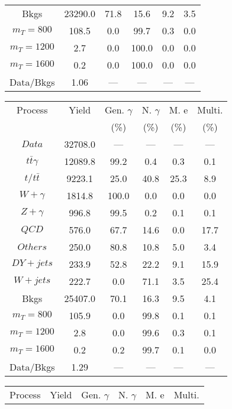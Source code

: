 \begin{figure}
\begin{minipage}[c]{0.32\textwidth}
{\begin{tabular}{cccccc}
Bkgs &  23290.0 &  71.8 &  15.6 &  9.2 &  3.5\\
$ m_{T} = 800 $ &  108.5 &  0.0 &  99.7 &  0.3 &  0.0\\
$ m_{T} = 1200 $ &  2.7 &  0.0 &  100.0 &  0.0 &  0.0\\
$ m_{T} = 1600 $ &  0.2 &  0.0 &  100.0 &  0.0 &  0.0\\
Data/Bkgs &  1.06 &  --- &  --- &  --- &  ---\\
\hline
\end{tabular}
}
\end{minipage}
\begin{minipage}[c]{0.32\textwidth}
\centering
\tiny{
\begin{tabular}{cccccc}
\hline
Process & Yield & Gen. $\gamma$ & N. $\gamma$ & M. e & Multi. \\
 &  & (\%) & (\%) & (\%) & (\%)  \\
\hline
                                                                      $ Data $ &  32708.0 &  --- &  --- &  --- &  ---\\
$ t\bar{t}\gamma $ &  12089.8 &  99.2 &  0.4 &  0.3 &  0.1\\
$ t/t\bar{t} $ &  9223.1 &  25.0 &  40.8 &  25.3 &  8.9\\
$ W+\gamma $ &  1814.8 &  100.0 &  0.0 &  0.0 &  0.0\\
$ Z+\gamma $ &  996.8 &  99.5 &  0.2 &  0.1 &  0.1\\
$ QCD $ &  576.0 &  67.7 &  14.6 &  0.0 &  17.7\\
$ Others $ &  250.0 &  80.8 &  10.8 &  5.0 &  3.4\\
$ DY+jets $ &  233.9 &  52.8 &  22.2 &  9.1 &  15.9\\
$ W+jets $ &  222.7 &  0.0 &  71.1 &  3.5 &  25.4\\
Bkgs &  25407.0 &  70.1 &  16.3 &  9.5 &  4.1\\
$ m_{T} = 800 $ &  105.9 &  0.0 &  99.8 &  0.1 &  0.1\\
$ m_{T} = 1200 $ &  2.8 &  0.0 &  99.6 &  0.3 &  0.1\\
$ m_{T} = 1600 $ &  0.2 &  0.2 &  99.7 &  0.1 &  0.0\\
Data/Bkgs &  1.29 &  --- &  --- &  --- &  ---\\
\hline
\end{tabular}
}
\end{minipage}
\begin{minipage}[c]{0.32\textwidth}
\centering
\tiny{
\begin{tabular}{cccccc}
\hline
Process & Yield & Gen. $\gamma$ & N. $\gamma$ & M. e & Multi. \\

\end{tabular}}
\end{minipage}
\end{figure}
